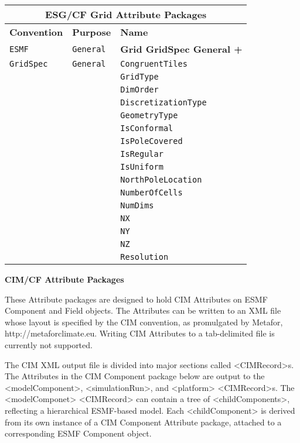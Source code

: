\label{GridAttributePackages}
\begin{tabular}{|p{4cm}|p{4cm}|p{6cm}|}
\hline
\multicolumn{3}{|c|}{{\bf \large ESG/CF Grid Attribute Packages}} \\
\hline\hline
{\bf Convention} & {\bf Purpose} & {\bf Name} \\
\hline\hline
{\tt ESMF} & {\tt General} & {\bf Grid GridSpec General +} \\
{\tt GridSpec} & {\tt General} & {\tt CongruentTiles} \\
 & & {\tt GridType} \\ 
 & & {\tt DimOrder} \\ 
 & & {\tt DiscretizationType} \\ 
 & & {\tt GeometryType} \\ 
 & & {\tt IsConformal} \\ 
 & & {\tt IsPoleCovered} \\ 
 & & {\tt IsRegular} \\ 
 & & {\tt IsUniform} \\ 
 & & {\tt NorthPoleLocation} \\ 
 & & {\tt NumberOfCells} \\ 
 & & {\tt NumDims} \\ 
 & & {\tt NX} \\ 
 & & {\tt NY} \\ 
 & & {\tt NZ} \\ 
 & & {\tt Resolution} \\ 
\hline
\end{tabular}

\vspace{18pt}

{\bf \large CIM/CF Attribute Packages}

These Attribute packages are designed to hold CIM Attributes on ESMF Component and Field objects. The Attributes can be written to an XML file whose layout is specified by the CIM convention, as promulgated by Metafor, http://metaforclimate.eu.  Writing CIM Attributes to a tab-delimited file is currently not supported.

The CIM XML output file is divided into major sections called <CIMRecord>s.  The Attributes in the CIM Component package below are output to the <modelComponent>, <simulationRun>, and <platform> <CIMRecord>s.  The <modelComponet> <CIMRecord> can contain a tree of <childComponents>, reflecting a hierarchical ESMF-based model.  Each <childComponent> is derived from its own instance of a CIM Component Attribute package, attached to a corresponding ESMF Component object.


